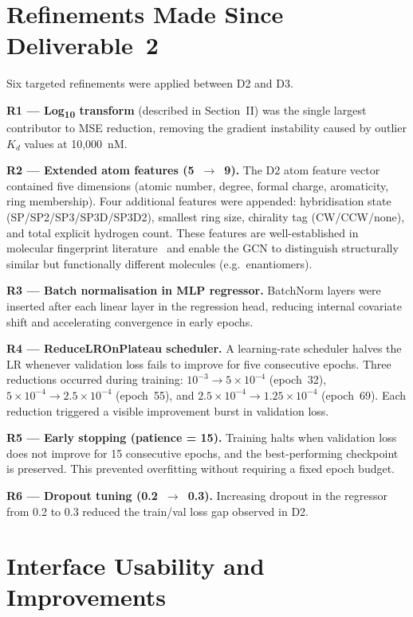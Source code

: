 \documentclass[conference]{IEEEtran}
\begin{document}
\section{Refinements Made Since Deliverable~2}

Six targeted refinements were applied between D2 and D3.

\textbf{R1 --- Log\textsubscript{10} transform} (described in Section~II)
was the single largest contributor to MSE reduction, removing the gradient
instability caused by outlier $K_d$ values at 10,000~nM.

\textbf{R2 --- Extended atom features (5~$\to$~9).}
The D2 atom feature vector contained five dimensions (atomic number, degree,
formal charge, aromaticity, ring membership). Four additional features were
appended: hybridisation state (SP/SP2/SP3/SP3D/SP3D2), smallest ring size,
chirality tag (CW/CCW/none), and total explicit hydrogen count. These features
are well-established in molecular fingerprint literature~\cite{rogers2010} and
enable the GCN to distinguish structurally similar but functionally different
molecules (e.g.\ enantiomers).

\textbf{R3 --- Batch normalisation in MLP regressor.}
BatchNorm layers were inserted after each linear layer in the regression head,
reducing internal covariate shift and accelerating convergence in early epochs.

\textbf{R4 --- ReduceLROnPlateau scheduler.}
A learning-rate scheduler halves the LR whenever validation loss fails to
improve for five consecutive epochs. Three reductions occurred during training:
$10^{-3} \to 5\times10^{-4}$ (epoch~32), $5\times10^{-4} \to 2.5\times10^{-4}$
(epoch~55), and $2.5\times10^{-4} \to 1.25\times10^{-4}$ (epoch~69). Each
reduction triggered a visible improvement burst in validation loss.

\textbf{R5 --- Early stopping (patience = 15).}
Training halts when validation loss does not improve for 15 consecutive epochs,
and the best-performing checkpoint is preserved. This prevented overfitting
without requiring a fixed epoch budget.

\textbf{R6 --- Dropout tuning (0.2~$\to$~0.3).}
Increasing dropout in the regressor from 0.2 to 0.3 reduced the train/val loss
gap observed in D2.

\section{Interface Usability and Improvements}
\end{document}
